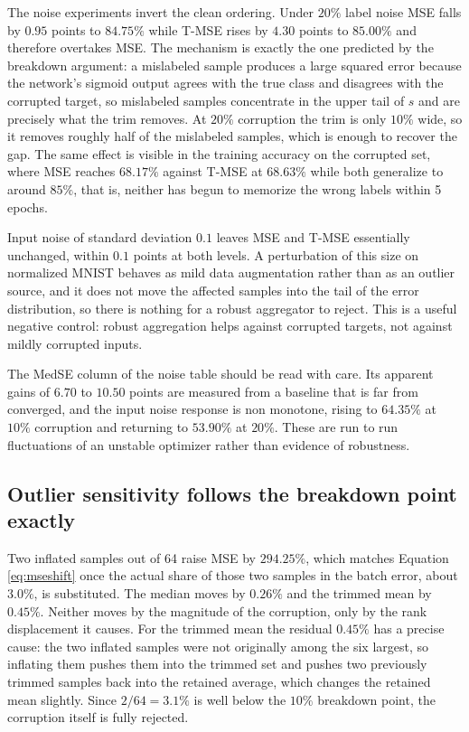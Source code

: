 \documentclass[12pt]{article}
\begin{document}
The noise experiments invert the clean ordering. Under $20\%$ label noise MSE falls by $0.95$ points to $84.75\%$ while T-MSE rises by $4.30$ points to $85.00\%$ and therefore overtakes MSE. The mechanism is exactly the one predicted by the breakdown argument: a mislabeled sample produces a large squared error because the network's sigmoid output agrees with the true class and disagrees with the corrupted target, so mislabeled samples concentrate in the upper tail of $s$ and are precisely what the trim removes. At $20\%$ corruption the trim is only $10\%$ wide, so it removes roughly half of the mislabeled samples, which is enough to recover the gap. The same effect is visible in the training accuracy on the corrupted set, where MSE reaches $68.17\%$ against T-MSE at $68.63\%$ while both generalize to around $85\%$, that is, neither has begun to memorize the wrong labels within 5 epochs.

Input noise of standard deviation $0.1$ leaves MSE and T-MSE essentially unchanged, within $0.1$ points at both levels. A perturbation of this size on normalized MNIST behaves as mild data augmentation rather than as an outlier source, and it does not move the affected samples into the tail of the error distribution, so there is nothing for a robust aggregator to reject. This is a useful negative control: robust aggregation helps against corrupted targets, not against mildly corrupted inputs.

The MedSE column of the noise table should be read with care. Its apparent gains of $6.70$ to $10.50$ points are measured from a baseline that is far from converged, and the input noise response is non monotone, rising to $64.35\%$ at $10\%$ corruption and returning to $53.90\%$ at $20\%$. These are run to run fluctuations of an unstable optimizer rather than evidence of robustness.

\subsection{Outlier sensitivity follows the breakdown point exactly}

Two inflated samples out of 64 raise MSE by $294.25\%$, which matches Equation \ref{eq:mseshift} once the actual share of those two samples in the batch error, about $3.0\%$, is substituted. The median moves by $0.26\%$ and the trimmed mean by $0.45\%$. Neither moves by the magnitude of the corruption, only by the rank displacement it causes. For the trimmed mean the residual $0.45\%$ has a precise cause: the two inflated samples were not originally among the six largest, so inflating them pushes them into the trimmed set and pushes two previously trimmed samples back into the retained average, which changes the retained mean slightly. Since $2/64 = 3.1\%$ is well below the $10\%$ breakdown point, the corruption itself is fully rejected.
\end{document}
